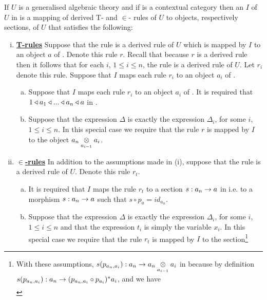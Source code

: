 

\begin{definition}
If $U$ is a generalised algebraic theory and if \catcw is a contextual category then an  $I$ of $U$ in \catcw is a  mapping 
of derived T- and $\in$- rules of $U$ to objects, respectively sections, of $U$ that satisfies the following:
\begin{enumerate}[(i)]
\setlength\itemindent{2cm}
\item \underline{\textbf{T-rules}} 
Suppose that  the rule
 is a derived rule of $U$ which is mapped by $I$ to an object $a$ of \catc. Denote this rule $r$. Recall that because $r$ is a derived rule then it follows  that for each $i$, 
$1 \leq i \leq n$, the rule  is a derived rule of $U$. Let $r_i$ denote this rule.
Suppose that $I$ maps each rule $r_i$ to an object $a_i$ of \catcw.
\begin{enumerate}[(a)]
\item 
Suppose that $I$ maps each rule $r_i$ to an object $a_i$ of \catcw.
It is required that $1 \base a_1 \base ... \base a_n \base a$ in \catc.
\item Suppose that the  expression $\Delta$ is exactly the expression $\Delta_i$, for some $i$, $1 \leq i \leq n$. In this special case we require that the rule $r$  is mapped by $I$ to the object 
$\crossx{a_n}{a_i}{a_{i-1}}$.
\end{enumerate} 
\item \underline{\textbf{$\boldsymbol {\in}$-rules}} 
In addition to the assumptions made in (i),  suppose that the rule
 is a  derived rule of $U$. 
Denote this rule $r_t$. 
\begin{enumerate}[(a)]
\item 
It is required that $I$ maps the rule $r_t$ to a section
 $s:a_n \morph a$ in \catcw i.e. to a morphism $s:a_n \morph a$ such that $s \circ p_a = id_{a_n}$. 
\item Suppose that the  expression $\Delta$ is exactly the expression $\Delta_i$, for some $i$, $1 \leq i \leq n$ and that the expression $t_i$ is simply the variable $x_i$. 
In this special case we require that the rule $r_t$  is mapped by $I$ to the section\footnote{
With these assumptions, $s(p_{a_n,a_i}): a_n \morph \crossx{a_n}{a_i}{a_{i-1}}$ in \catcw because by definition  $s(p_{a_n,a_i}): a_n  \morph (p_{a_n,a_i} \circ p_{a_i})^*a_i$,
and we have 
\begin{align*}

\end{align*}}
\end{enumerate}
\end{enumerate}
\end{definition}
